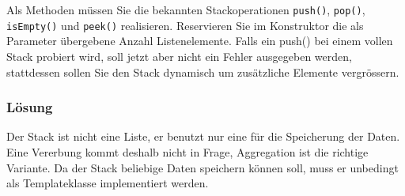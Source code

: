Als Methoden müssen Sie die bekannten Stackoperationen \texttt{push()}, \texttt{pop()}, \texttt{isEmpty()} und \texttt{peek()} realisieren. Reservieren Sie im Konstruktor die als Parameter übergebene Anzahl Listenelemente. Falls ein push() bei einem vollen Stack probiert wird, soll jetzt aber nicht ein Fehler ausgegeben werden, stattdessen sollen Sie den Stack dynamisch um zusätzliche Elemente vergrössern.

\subsubsection{Lösung}
Der Stack ist nicht eine Liste, er benutzt nur eine für die Speicherung der Daten. Eine Vererbung kommt deshalb nicht in Frage, Aggregation ist die richtige Variante. Da der Stack beliebige Daten speichern können soll, muss er unbedingt als Templateklasse implementiert werden.


\noindent\makebox[\linewidth]{\rule{\paperwidth}{0.4pt}}

\noindent\makebox[\linewidth]{\rule{\paperwidth}{0.4pt}}

\noindent\makebox[\linewidth]{\rule{\paperwidth}{0.4pt}}

